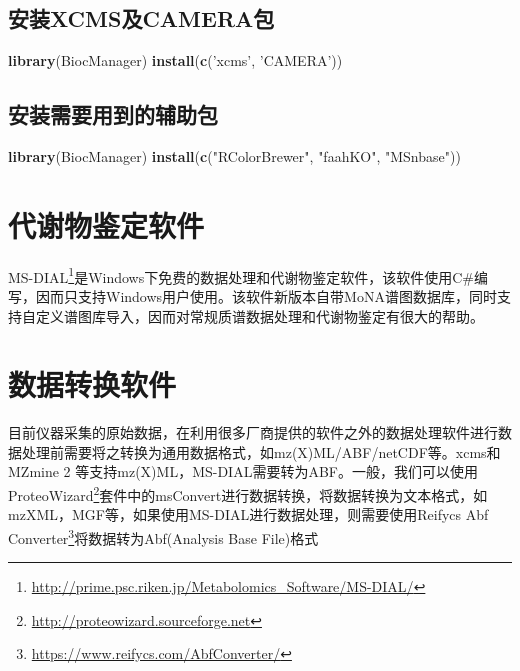 \documentclass[]{ctexbook}
\newenvironment{Shaded}{\begin{snugshade}}{\end{snugshade}}
\newcommand{\KeywordTok}[1]{\textcolor[rgb]{0.13,0.29,0.53}{\textbf{#1}}}
\newcommand{\NormalTok}[1]{#1}
\newcommand{\StringTok}[1]{\textcolor[rgb]{0.31,0.60,0.02}{#1}}
\renewcommand{\href}[2]{#2\footnote{\url{#1}}}
\begin{document}
\hypertarget{xcmscamera}{%
\subsection{安装XCMS及CAMERA包}\label{xcmscamera}}

\begin{Shaded}
\begin{Highlighting}[]
\KeywordTok{library}\NormalTok{(BiocManager)}
\KeywordTok{install}\NormalTok{(}\KeywordTok{c}\NormalTok{(}\StringTok{'xcms'}\NormalTok{, }\StringTok{'CAMERA'}\NormalTok{))}
\end{Highlighting}
\end{Shaded}

\subsection{安装需要用到的辅助包}

\begin{Shaded}
\begin{Highlighting}[]
\KeywordTok{library}\NormalTok{(BiocManager)}
\KeywordTok{install}\NormalTok{(}\KeywordTok{c}\NormalTok{(}\StringTok{"RColorBrewer"}\NormalTok{, }\StringTok{"faahKO"}\NormalTok{, }\StringTok{"MSnbase"}\NormalTok{))}
\end{Highlighting}
\end{Shaded}

\section{代谢物鉴定软件}

\href{http://prime.psc.riken.jp/Metabolomics_Software/MS-DIAL/}{MS-DIAL}是Windows下免费的数据处理和代谢物鉴定软件，该软件使用C\#编写，因而只支持Windows用户使用。该软件新版本自带MoNA谱图数据库，同时支持自定义谱图库导入，因而对常规质谱数据处理和代谢物鉴定有很大的帮助。

\section{数据转换软件}

目前仪器采集的原始数据，在利用很多厂商提供的软件之外的数据处理软件进行数据处理前需要将之转换为通用数据格式，如mz(X)ML/ABF/netCDF等。xcms和MZmine 2 等支持mz(X)ML，MS-DIAL需要转为ABF。一般，我们可以使用\href{http://proteowizard.sourceforge.net}{ProteoWizard}套件中的msConvert进行数据转换，将数据转换为文本格式，如mzXML，MGF等，如果使用MS-DIAL进行数据处理，则需要使用\href{https://www.reifycs.com/AbfConverter/}{Reifycs Abf Converter}将数据转为Abf(Analysis Base File)格式
\end{document}
